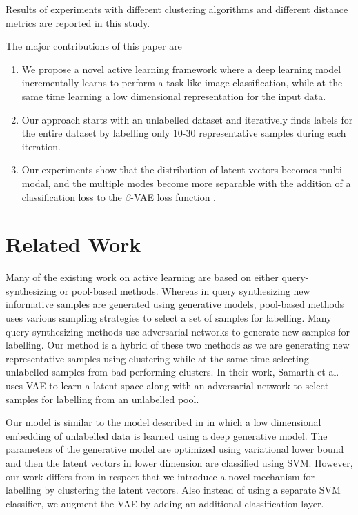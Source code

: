 \documentclass[runningheads]{llncs}
\begin{document}
Results of experiments with different clustering algorithms and  different distance metrics are reported in this study.

The major contributions of this paper are
\begin{enumerate}
    \item We propose a novel active learning framework where a  deep learning model incrementally learns to perform a task like image classification, while at the same time learning a low dimensional representation for the input data.
    \item Our approach starts with an unlabelled dataset and iteratively finds labels for the entire dataset by labelling only 10-30 representative samples during each iteration.
    \item Our experiments show that the distribution of latent vectors becomes multi-modal, and the multiple modes become more separable with the addition of a classification loss to the $\beta$-VAE loss function \cite{beta_vae}.
\end{enumerate}

\section{Related Work}
Many of the existing work on active learning are based on either query-synthesizing or  pool-based methods.
Whereas in query synthesizing new informative samples are generated using generative models, pool-based methods \cite{wang_2016,beluch_2018} uses various sampling strategies to select a set of samples for labelling.
Many query-synthesizing methods use adversarial networks \cite{mahapatra_2018,mayer_2020} to generate new samples for labelling.
Our method is a hybrid of these two methods as we are generating new representative samples using clustering while at the same time selecting unlabelled samples from bad performing clusters.
In their work, Samarth et al. \cite{vaal} uses VAE to learn a latent space along with an adversarial network to select samples for labelling from an unlabelled pool.

Our model is similar to the model described in \cite{kingma_2014} in which a low dimensional embedding of unlabelled data is learned using a deep generative model.
The parameters of the generative model are optimized using variational lower bound and then the latent vectors in lower dimension are classified using SVM.
However, our work differs from \cite{kingma_2014} in respect that we introduce a novel mechanism for labelling by clustering the latent vectors.
Also instead of using a separate SVM classifier, we augment the VAE by adding an additional classification layer.
\end{document}
